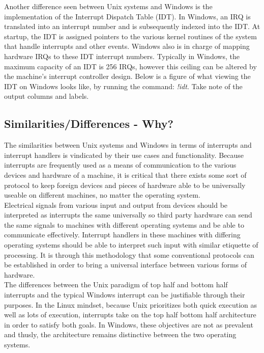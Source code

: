 \documentclass[letterpaper,10pt,titlepage]{article}
\begin{document}
Another difference seen between Unix systems and Windows is the implementation of the Interrupt Dispatch Table (IDT).  In Windows, an IRQ is translated into an interrupt number and is subsequently indexed into the IDT.  At startup, the IDT is assigned pointers to the various kernel routines of the system that handle interrupts and other events.  Windows also is in charge of mapping hardware IRQs to these IDT interrupt numbers.  Typically in Windows, the maximum capacity of an IDT is 256 IRQs, however this ceiling can be altered by the machine's interrupt controller design.  Below is a figure of what viewing the IDT on Windows looks like, by running the command: \textit{!idt}.\cite{mwi3} Take note of the output columns and labels.\\



\subsection{Similarities/Differences - Why?}

The similarities between Unix systems and Windows in terms of interrupts and interrupt handlers is vindicated by their use cases and functionality.  Because interrupts are frequently used as a means of communication to the various devices and hardware of a machine, it is critical that there exists some sort of protocol to keep foreign devices and pieces of hardware able to be universally useable on different machines, no matter the operating system.\\

Electrical signals from various input and output from devices should be interpreted as interrupts the same universally so third party hardware can send the same signals to machines with different operating systems and be able to communicate effectively.  Interrupt handlers in these machines with differing operating systems should be able to interpret such input with similar etiquette of processing.  It is through this methodology that some conventional protocols can be established in order to bring a universal interface between various forms of hardware.\\

The differences between the Unix paradigm of top half and bottom half interrupts and the typical Windows interrupt can be justifiable through their purposes.  In the Linux mindset, because Unix prioritizes both quick execution as well as lots of execution, interrupts take on the top half bottom half architecture in order to satisfy both goals.  In Windows, these objectives are not as prevalent and thusly, the architecture remains distinctive between the two operating systems.\\
\end{document}
